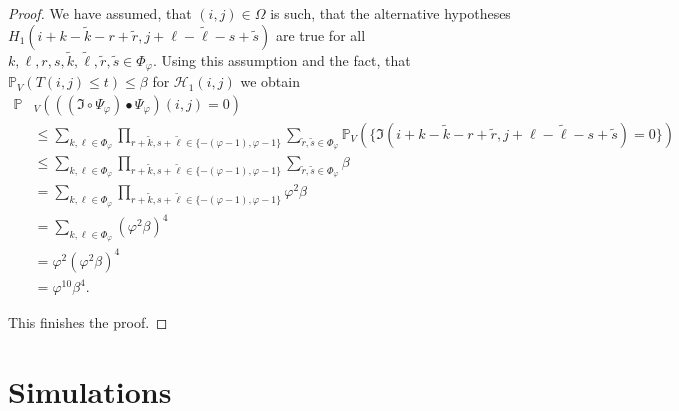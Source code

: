 \documentclass[a4paper,12pt]{article}
\theoremstyle{plain}
\theoremstyle{definition}
\begin{document}
\begin{appendix}
\begin{proof}
		We have assumed, that $(i, j) \in \Omega$ is such, that the alternative hypotheses $H_1(i + k - \tilde{k} - r + \tilde{r}, j + \ell - \tilde{\ell} - s + \tilde{s})$ are true for all $k, \ell, r, s, \tilde{k}, \tilde{\ell}, \tilde{r}, \tilde{s} \in \Phi_\varphi$. Using this assumption and the fact, that $\mathbb{P}_V\left( T(i, j) \leq t \right) \leq \beta$ for $\mathcal{H}_1(i, j)$ we obtain
		\begin{align*}
			\mathbb{P}&_V\left( ((\mathfrak{I} \circ \Psi_\varphi) \bullet \Psi_\varphi)(i, j) = 0 \right) \\
			&\leq \sum_{k, \ell \in \Phi_\varphi} \prod_{r + \tilde{k}, s + \tilde{\ell} \in \{ - ( \varphi - 1 ), \varphi - 1 \}} \sum_{\tilde{r}, \tilde{s} \in \Phi_\varphi} \mathbb{P}_V\left( \{ \mathfrak{I}(i + k - \tilde{k} - r + \tilde{r}, j + \ell - \tilde{\ell} - s + \tilde{s}) = 0 \} \right) \\
			&\leq \sum_{k, \ell \in \Phi_\varphi} \prod_{r + \tilde{k}, s + \tilde{\ell} \in \{ - ( \varphi - 1 ), \varphi - 1 \}} \sum_{\tilde{r}, \tilde{s} \in \Phi_\varphi} \beta \\
			&= \sum_{k, \ell \in \Phi_\varphi} \prod_{r + \tilde{k}, s + \tilde{\ell} \in \{ - ( \varphi - 1 ), \varphi - 1 \}} \varphi^2 \beta \\
			&= \sum_{k, \ell \in \Phi_\varphi} ( \varphi^2 \beta )^4 \\
			&= \varphi^2 ( \varphi^2 \beta )^4 \\
			&= \varphi^{10} \beta^4.
		\end{align*}
		
		This finishes the proof.
	\end{proof}
	
	\newpage
	
	\section{Simulations}\label{appendix: simulations}
	
	
	
	
	
	
	
	
	
	
	
	
	
	
	

\end{appendix}
\end{document}
